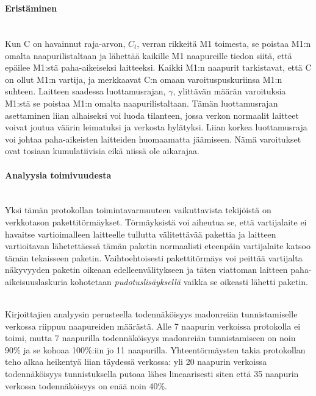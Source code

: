 \documentclass[finnish]{tktltiki2}
\theoremstyle{definition}
\theoremstyle{remark}
\begin{document}
\noindent\\

\paragraph{Eristäminen}
\noindent \\
Kun C on havainnut raja-arvon, $C_t$, verran rikkeitä M1 toimesta, se poistaa M1:n omalta naapurilistaltaan ja lähettää kaikille M1 naapureille tiedon siitä, että epäilee M1:stä paha-aikeiseksi laitteeksi. Kaikki M1:n naapurit tarkistavat, että C on ollut M1:n vartija, ja merkkaavat C:n omaan varoituspuskuriinsa M1:n suhteen. Laitteen saadessa luottamusrajan, $\gamma$, ylittävän määrän varoituksia M1:stä se poistaa M1:n omalta naapurilistaltaan. Tämän luottamusrajan asettaminen liian alhaiseksi voi luoda tilanteen, jossa verkon normaalit laitteet voivat joutua väärin leimatuksi ja verkosta hylätyksi. Liian korkea luottamusraja voi johtaa paha-aikeisten laitteiden huomaamatta jäämiseen. Nämä varoitukset ovat tosiaan kumulatiivisia eikä niissä ole aikarajaa.

\paragraph{Analyysia toimivuudesta}
\noindent \\
Yksi tämän protokollan toimintavarmuuteen vaikuttavista tekijöistä on verkkotason pakettitörmäykset. Törmäyksistä voi aiheutua se, että vartijalaite ei havaitse vartioimalleen laitteelle tullutta välitettävää pakettia ja laitteen vartioitavan lähetettäessä tämän paketin normaalisti eteenpäin vartijalaite katsoo tämän tekaisseen paketin. Vaihtoehtoisesti pakettitörmäys voi peittää vartijalta näkyvyyden paketin oikeaan edelleenvälitykseen ja täten viattoman laitteen paha-aikeisuuslaskuria kohotetaan \emph{pudotuslisäyksellä} vaikka se oikeasti lähetti paketin.

\noindent \\
Kirjoittajien analyysin perusteella todennäköisyys madonreiän tunnistamiselle verkossa riippuu naapureiden määrästä. Alle 7 naapurin verkoissa protokolla ei toimi, mutta 7 naapurilla todennäköisyys madonreiän tunnistamiseen on noin 90\% ja se kohoaa 100\%:iin jo 11 naapurilla. Yhteentörmäysten takia protokollan teho alkaa heikentyä liian täydessä verkossa: yli 20 naapurin verkoissa todennäköisyys tunnistuksella putoaa lähes lineaarisesti siten että 35 naapurin verkossa todennäköisyys on enää noin 40\%.
\end{document}
